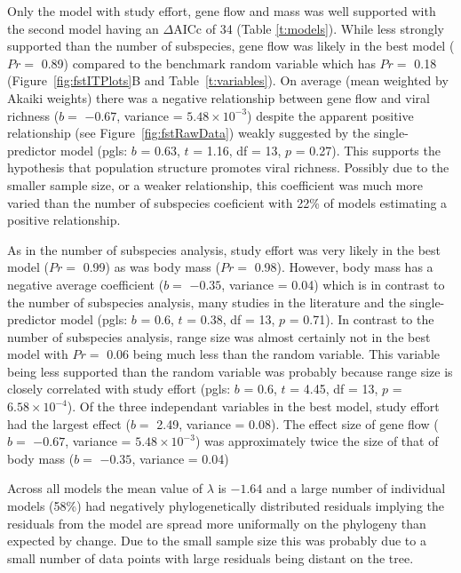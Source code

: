 
Only the model with study effort, gene flow and mass was well supported with the second model having an $\Delta\text{AICc}$ of 34 (Table \ref{t:models}).
While less strongly supported than the number of subspecies, gene flow was likely in the best model ($Pr = $ 0.89) compared to the benchmark random variable which has $Pr = $ 0.18 (Figure~\ref{fig:fstITPlots}B and Table~\ref{t:variables}).
On average (mean weighted by Akaiki weights) there was a negative relationship between gene flow and viral richness ($b = $ \ensuremath{-0.67}, variance = \ensuremath{5.48\times 10^{-3}}) despite the apparent positive relationship (see Figure~\ref{fig:fstRawData}) weakly suggested by the single-predictor model (pgls: $b$ = 0.63, $t$ = 1.16, df = 13, $p$ = 0.27).
This supports the hypothesis that population structure promotes viral richness.
Possibly due to the smaller sample size, or a weaker relationship, this coefficient was much more varied than the number of subspecies coeficient with 22\% of models estimating a positive relationship.

As in the number of subspecies analysis, study effort was very likely in the best model ($Pr = $ 0.99) as was body mass ($Pr = $ 0.98).
However, body mass has a negative average coefficient ($b = $ \ensuremath{-0.35}, variance = 0.04) which is in contrast to the number of subspecies analysis, many studies in the literature \cite{kamiya2014determines, turmelle2009correlates, gay2014parasite, maganga2014bat} and the single-predictor model (pgls: $b$ = 0.6, $t$ = 0.38, df = 13, $p$ = 0.71).
In contrast to the number of subspecies analysis, range size was almost certainly not in the best model with $Pr = $ 0.06 being much less than the random variable.
This variable being less supported than the random variable was probably because range size is closely correlated with study effort (pgls: $b$ = 0.6, $t$ = 4.45, df = 13, $p$ = \ensuremath{6.58\times 10^{-4}}).
Of the three independant variables in the best model, study effort had the largest effect ($b = $ 2.49, variance = 0.08).
The effect size of gene flow ($b = $ \ensuremath{-0.67}, variance = \ensuremath{5.48\times 10^{-3}}) was approximately twice the size of that of body mass ($b = $ \ensuremath{-0.35}, variance = 0.04)

Across all models the mean value of $\lambda$ is \ensuremath{-1.64} and a large number of individual models (58\%)  had negatively phylogenetically distributed residuals implying the residuals from the model are spread more uniformally on the phylogeny than expected by change.
Due to the small sample size this was probably due to a small number of data points with large residuals being distant on the tree.







